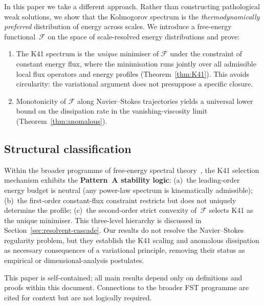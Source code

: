 \documentclass[12pt,a4paper]{article}
\theoremstyle{definition}
\theoremstyle{plain}
\theoremstyle{remark}
\begin{document}
In this paper we take a different approach.  Rather than constructing
pathological weak solutions, we show that the Kolmogorov spectrum is the
\emph{thermodynamically preferred} distribution of energy across scales.
We introduce a free-energy functional~$\mathcal{F}$ on the space of
scale-resolved energy distributions and prove:
\begin{enumerate}
  \item The K41 spectrum is the \emph{unique} minimiser of $\mathcal{F}$
        under the constraint of constant energy flux, where the minimisation
        runs jointly over all admissible local flux operators and energy
        profiles (Theorem~\ref{thm:K41}).  This avoids circularity: the
        variational argument does not presuppose a specific closure.
  \item Monotonicity of $\mathcal{F}$ along Navier--Stokes trajectories
        yields a universal lower bound on the dissipation rate in the
        vanishing-viscosity limit (Theorem~\ref{thm:anomalous}).
\end{enumerate}

\subsection{Structural classification}

Within the broader programme of free-energy spectral
theory~\cite{FST-Unified2026}, the K41 selection mechanism exhibits the
\textbf{Pattern~A stability logic}: (a)~the leading-order energy budget is
neutral (any power-law spectrum is kinematically admissible); (b)~the
first-order constant-flux constraint restricts but does not uniquely
determine the profile; (c)~the second-order strict convexity
of~$\mathcal{F}$ selects K41 as the unique minimiser.  This three-level
hierarchy is discussed in Section~\ref{sec:resolvent-cascade}.
Our results do not resolve the Navier--Stokes regularity problem, but they
establish the K41 scaling and anomalous dissipation as necessary
consequences of a variational principle, removing their status as empirical
or dimensional-analysis postulates.

This paper is self-contained; all main results depend only on definitions and proofs within this document. Connections to the broader FST programme are cited for context but are not logically required.
\end{document}
